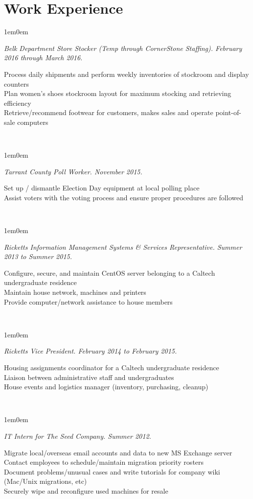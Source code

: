 \documentclass[10pt,letterpaper, full]{article}
\newcommand{\pjtitle}[1]{\renewcommand{\givenpjtitle}{#1}}
\newcommand{\pjtime}[1]{\renewcommand{\givenpjtime}{#1}}
\newcommand{\pjbody}[1]{\renewcommand{\givenpjbody}{#1}}
\newcommand{\givenpjtitle}{REQUIRED!}
\newcommand{\givenpjtime}{REQUIRED!}
\newcommand{\givenpjbody}{REQUIRED!}
\newenvironment{projectenv}
    {
        \begin{adjustwidth}{1em}{0em}
    }
    {
        \textit{\givenpjtitle. \givenpjtime.}

        \begin{minipage}[l]{\textwidth}
            \givenpjbody%
        \end{minipage}\\%


        \end{adjustwidth}
    }
\begin{document}
\section{Work Experience}
\begin{projectenv}%
    \pjtitle{Belk Department Store Stocker (Temp through CornerStone Staffing)}
    \pjtime{February 2016 through March 2016}
    \pjbody{
        Process daily shipments and perform weekly inventories of stockroom and display counters\\
        Plan women's shoes stockroom layout for maximum stocking and retrieving efficiency\\
        Retrieve/recommend footwear for customers, makes sales and operate point-of-sale computers
    }
\end{projectenv}%

\begin{projectenv}%
    \pjtitle{Tarrant County Poll Worker}
    \pjtime{November 2015}
    \pjbody{
        Set up / dismantle Election Day equipment at local polling place\\
        Assist voters with the voting process and ensure proper procedures are followed
    }
\end{projectenv}%

\newpage

\begin{projectenv}%
    \pjtitle{Ricketts Information Management Systems \& Services Representative}
    \pjtime{Summer 2013 to Summer 2015}
    \pjbody{
        Configure, secure, and maintain CentOS server belonging to a Caltech
        undergraduate residence\\
        Maintain house network, machines and printers\\
        Provide computer/network assistance to house members
    }
\end{projectenv}%

\begin{projectenv}%
    \pjtitle{Ricketts Vice President}
    \pjtime{February 2014 to February 2015}
    \pjbody{
        Housing assignments coordinator for a Caltech undergraduate residence\\
        Liaison between administrative staff and undergraduates\\
        House events and logistics manager (inventory, purchasing, cleanup)
    }
\end{projectenv}%

\begin{projectenv}%
    \pjtitle{IT Intern for The Seed Company}
    \pjtime{Summer 2012}
    \pjbody{
        Migrate local/overseas email accounts and data to new MS Exchange server\\
        Contact employees to schedule/maintain migration priority rosters\\
        Document problems/unusual cases and write tutorials for company wiki (Mac/Unix migrations, etc)\\
        Securely wipe and reconfigure used machines for resale
    }
\end{projectenv}%
\end{document}
